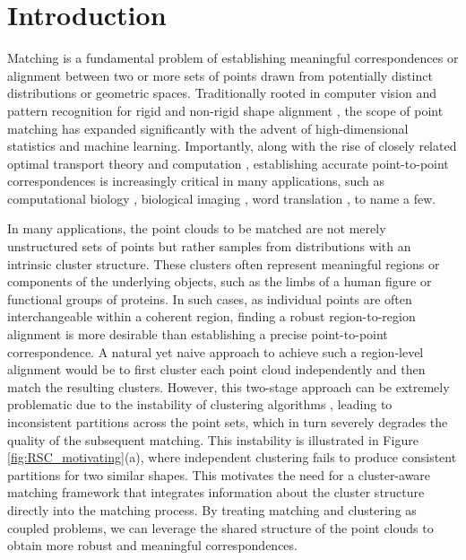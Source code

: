 \documentclass{article}
\theoremstyle{definition}
\begin{document}
\section{Introduction} 
Matching is a fundamental problem of establishing meaningful correspondences or alignment \cite{van2011survey,sahilliouglu2020recent} between two or more sets of points drawn from potentially distinct distributions or geometric spaces. Traditionally rooted in computer vision and pattern recognition for rigid and non-rigid shape alignment \cite{besl1992method,myronenko2010point}, the scope of point matching has expanded significantly with the advent of high-dimensional statistics and machine learning. Importantly, along with the rise of closely related optimal transport theory \cite{villani_2003} and computation \cite{peyre2019computational}, establishing accurate point-to-point correspondences is increasingly critical in many applications, such as computational biology \cite{schiebinger2019optimal,blumberg2020mrec}, biological imaging \cite{riahi2023alignot,singer2024alignment,xiao2025optimal}, word translation \cite{alvarez2018gromov,grave2019unsupervised}, to name a few.

In many applications, the point clouds to be matched are not merely unstructured sets of points but rather samples from distributions with an intrinsic cluster structure. These clusters often represent meaningful regions or components of the underlying objects, such as the limbs of a human figure or functional groups of proteins. In such cases, as individual points are often interchangeable within a coherent region, finding a robust region-to-region alignment is more desirable than establishing a precise point-to-point correspondence. A natural yet naive approach to achieve such a region-level alignment would be to first cluster each point cloud independently and then match the resulting clusters. However, this two-stage approach can be extremely problematic due to the instability of clustering algorithms \cite{ben2006sober,rakhlin2006stability,von2010clustering}, leading to inconsistent partitions across the point sets, which in turn severely degrades the quality of the subsequent matching. This instability is illustrated in Figure \ref{fig:RSC_motivating}(a), where independent clustering fails to produce consistent partitions for two similar shapes. This motivates the need for a cluster-aware matching framework that integrates information about the cluster structure directly into the matching process. By treating matching and clustering as coupled problems, we can leverage the shared structure of the point clouds to obtain more robust and meaningful correspondences.
\end{document}

